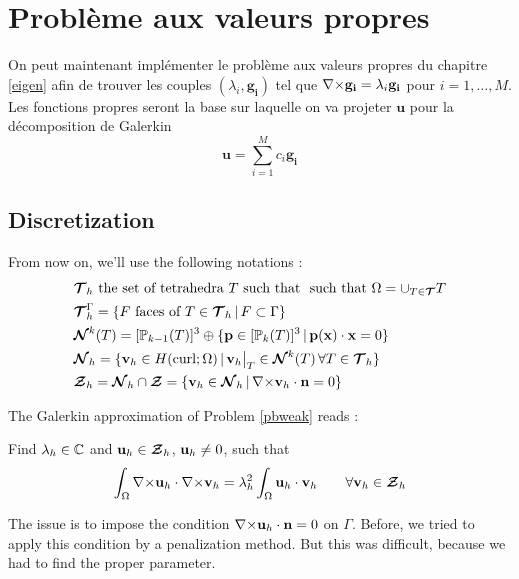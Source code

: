 \chapter{Problème aux valeurs propres}
On peut maintenant implémenter le problème aux valeurs propres du chapitre \ref{eigen} afin de trouver les couples $(\lambda_i,\mathbf{g_i})$ tel que ${\nabla\times}\mathbf{g_i}=\lambda_i\mathbf{g_i}$ pour $i=1,\dots,M$. Les fonctions propres seront la base sur laquelle on va projeter $\mathbf{u}$ pour la décomposition de Galerkin \[ \mathbf{u}=\sum_{i=1}^M c_i\mathbf{g_i} \]

\section{Discretization}
From now on, we'll use the following notations :
\begin{align*}
&{\bm{\mathcal{T}}}_h\mbox{ the set of tetrahedra } T \mbox{ such that }
\mbox{ such that } \Omega=\cup_{T\in{\bm{\mathcal{T}}}}T\\
&{\bm{\mathcal{T}}}_h^\Gamma =\{F\mbox{ faces of } T\in {\bm{\mathcal{T}}}_h \,|\, F\subset \Gamma
\}\\
&{\bm{\mathcal{N}}}^k(T)=[{\mathbb{P}}_{k-1}(T)]^3\oplus\{{\mathbf{p}}\in[{\mathbb{P}}_k(T)]^3 \,|\,
{\mathbf{p(x)}}\cdot{\mathbf{x}}=0 \}\\
&{\bm{\mathcal{N}}}_h=\{{\mathbf{v}}_h\in H(\mathrm{curl};\Omega) \,|\,
{\mathbf{v}}_h{\big\rvert_{T}}\in{\bm{\mathcal{N}}}^k(T)\, \forall T\in {\bm{\mathcal{T}}}_h \}\\
&{\bm{\mathcal{Z}}}_h={\bm{\mathcal{N}}}_h\cap{\bm{\mathcal{Z}}}=\{{\mathbf{v}}_h\in{\bm{\mathcal{N}}}_h \,|\,
{\nabla\times}{\mathbf{v}}_h\cdot{\mathbf{n}} = 0 \}
\end{align*}

The Galerkin approximation of Problem \ref{pbweak} reads :
\begin{pb}\label{pbdiscr}
Find $\lambda_h\in{\mathbb{C}}$ and ${\mathbf{u}}_h\in{\bm{\mathcal{Z}}}_h$, ${\mathbf{u}}_h\ne
0$, such that
\[\int_\Omega {\nabla\times}{\mathbf{u}}_h\cdot{\nabla\times}{\mathbf{v}}_h =
\lambda_h^2\int_\Omega {\mathbf{u}}_h\cdot{\mathbf{v}}_h \quad\quad
\forall{\mathbf{v}}_h\in{\bm{\mathcal{Z}}}_h \]
\end{pb}

The issue is to impose the condition
${\nabla\times}{\mathbf{u}}_h\cdot{\mathbf{n}}=0$ on $\Gamma$. Before, we tried to apply this
condition by a penalization method. But this was difficult, because we had to
find the proper parameter.\\

